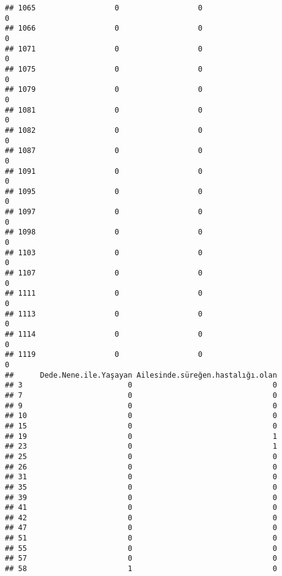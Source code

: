 \documentclass[
]{article}
\begin{document}
\begin{verbatim}
## 1065                  0                  0                              0
## 1066                  0                  0                              0
## 1071                  0                  0                              0
## 1075                  0                  0                              0
## 1079                  0                  0                              0
## 1081                  0                  0                              0
## 1082                  0                  0                              0
## 1087                  0                  0                              0
## 1091                  0                  0                              0
## 1095                  0                  0                              0
## 1097                  0                  0                              0
## 1098                  0                  0                              0
## 1103                  0                  0                              0
## 1107                  0                  0                              0
## 1111                  0                  0                              0
## 1113                  0                  0                              0
## 1114                  0                  0                              0
## 1119                  0                  0                              0
##      Dede.Nene.ile.Yaşayan Ailesinde.süreğen.hastalığı.olan
## 3                        0                                0
## 7                        0                                0
## 9                        0                                0
## 10                       0                                0
## 15                       0                                0
## 19                       0                                1
## 23                       0                                1
## 25                       0                                0
## 26                       0                                0
## 31                       0                                0
## 35                       0                                0
## 39                       0                                0
## 41                       0                                0
## 42                       0                                0
## 47                       0                                0
## 51                       0                                0
## 55                       0                                0
## 57                       0                                0
## 58                       1                                0

\end{verbatim}
\end{document}

